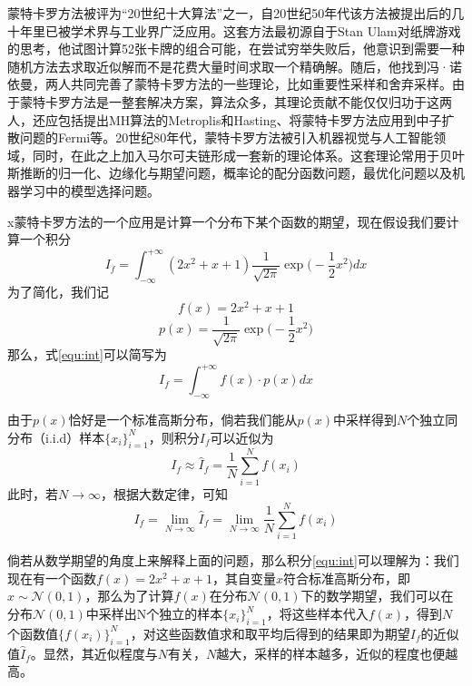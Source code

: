 蒙特卡罗方法被评为“20世纪十大算法”之一，自20世纪50年代该方法被提出后的几十年里已被学术界与工业界广泛应用。这套方法最初源自于Stan Ulam对纸牌游戏的思考，他试图计算52张卡牌的组合可能，在尝试穷举失败后，他意识到需要一种随机方法去求取近似解而不是花费大量时间求取一个精确解。随后，他找到冯·诺依曼，两人共同完善了蒙特卡罗方法的一些理论，比如重要性采样和舍弃采样。由于蒙特卡罗方法是一整套解决方案，算法众多，其理论贡献不能仅仅归功于这两人，还应包括提出MH算法的Metroplis和Hasting、将蒙特卡罗方法应用到中子扩散问题的Fermi等。20世纪80年代，蒙特卡罗方法被引入机器视觉与人工智能领域，同时，在此之上加入马尔可夫链形成一套新的理论体系。这套理论常用于贝叶斯推断的归一化、边缘化与期望问题，概率论的配分函数问题，最优化问题以及机器学习中的模型选择问题。



x蒙特卡罗方法的一个应用是计算一个分布下某个函数的期望，现在假设我们要计算一个积分
\begin{equation}\label{equ:int}
I_f = \int_{-\infty}^{+\infty} (2x^2 + x + 1) \frac{1}{\sqrt{2\pi}} \exp\Big(-\frac{1}{2}x^2\Big)dx
\end{equation}
为了简化，我们记
\begin{equation}\label{equ:f(x)}
f(x) = 2x^2 + x + 1
\end{equation}
\begin{equation}
p(x) = \frac{1}{\sqrt{2\pi}} \exp\Big(-\frac{1}{2}x^2\Big)
\end{equation}
那么，式\eqref{equ:int}可以简写为
\begin{equation}\label{equ:MCintFull}
I_f = \int_{-\infty}^{+\infty} f(x)\cdot p(x) dx
\end{equation}

由于$p(x)$恰好是一个标准高斯分布，倘若我们能从$p(x)$中采样得到$N$个独立同分布（i.i.d）样本$\{x_i\}_{i=1}^N$，则积分$I_f$可以近似为
\begin{equation}\label{equ:MCintProx}
I_f \approx \hat{I}_f = \frac{1}{N}\sum\limits_{i=1}^N f(x_i)
\end{equation}
此时，若$N\rightarrow \infty$，根据大数定律，可知
\begin{equation}
I_f = \lim\limits_{N\rightarrow \infty} \hat{I}_f = \lim\limits_{N\rightarrow \infty} \frac{1}{N}\sum\limits_{i=1}^N f(x_i)
\end{equation}

倘若从数学期望的角度上来解释上面的问题，那么积分\eqref{equ:int}可以理解为：我们现在有一个函数$f(x) = 2x^2 + x+ 1$，其自变量$x$符合标准高斯分布，即$x\sim \mathcal{N}(0, 1)$，那么为了计算$f(x)$在分布$\mathcal{N}(0, 1)$下的数学期望，我们可以在分布$\mathcal{N}(0, 1)$中采样出N个独立的样本$\{x_i\}_{i=1}^N$，将这些样本代入$f(x)$，得到$N$个函数值$\{f(x_i)\}_{i=1}^N$，对这些函数值求和取平均后得到的结果即为期望$I_f$的近似值$\hat{I}_f$。显然，其近似程度与$N$有关，$N$越大，采样的样本越多，近似的程度也便越高。

